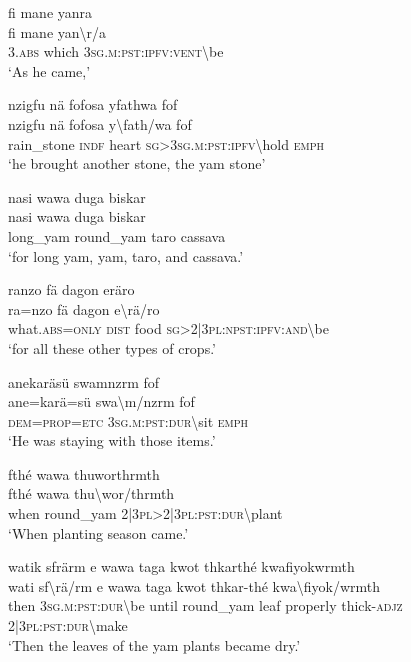 \ea\label{ex:1:a3775}
fi mane yanra\\
\gll fi	mane	yan{\textbackslash}r/a\\
     3.\textsc{abs}	which	3\textsc{sg}.\textsc{m}:\textsc{pst}:\textsc{ipfv}:\textsc{vent}{\textbackslash}be\\
\glt `As he came,'
\z

\ea\label{ex:1:a3776}
nzigfu nä fofosa yfathwa fof\\
\gll nzigfu	nä	fofosa	y{\textbackslash}fath/wa	fof\\
     rain\_stone	\textsc{indf}	heart	\textsc{sg}>3\textsc{sg}.\textsc{m}:\textsc{pst}:\textsc{ipfv}{\textbackslash}hold	\textsc{emph}\\
\glt `he brought another stone, the yam stone'
\z

\ea\label{ex:1:a3777}
nasi wawa duga biskar\\
\gll nasi	wawa	duga	biskar\\
     long\_yam	round\_yam	taro	cassava\\
\glt `for long yam, yam, taro, and cassava.'
\z

\ea\label{ex:1:a3781}
ranzo fä dagon eräro\\
\gll ra=nzo	fä	dagon	e{\textbackslash}rä/ro\\
     what.\textsc{abs}=\textsc{only}	\textsc{dist}	food	\textsc{sg}>2|3\textsc{pl}:\textsc{npst}:\textsc{ipfv}:\textsc{and}{\textbackslash}be\\
\glt `for all these other types of crops.'
\z

\ea\label{ex:1:a3782}
anekaräsü swamnzrm fof\\
\gll ane=karä=sü	swa{\textbackslash}m/nzrm	fof\\
     \textsc{dem}=\textsc{prop}=\textsc{etc}	3\textsc{sg}.\textsc{m}:\textsc{pst}:\textsc{dur}{\textbackslash}sit	\textsc{emph}\\
\glt `He was staying with those items.'
\z

\ea\label{ex:1:a3783}
fthé wawa thuworthrmth\\
\gll fthé	wawa	thu{\textbackslash}wor/thrmth\\
     when	round\_yam	2|3\textsc{pl}>2|3\textsc{pl}:\textsc{pst}:\textsc{dur}{\textbackslash}plant\\
\glt `When planting season came.'
\z

\ea\label{ex:1:a3784}
watik sfrärm e wawa taga kwot thkarthé kwafiyokwrmth\\
\gll wati	sf{\textbackslash}rä/rm	e	wawa	taga	kwot	thkar-thé	kwa{\textbackslash}fiyok/wrmth\\
     then	3\textsc{sg}.\textsc{m}:\textsc{pst}:\textsc{dur}{\textbackslash}be	until	round\_yam	leaf	properly	thick-\textsc{adjz}	2|3\textsc{pl}:\textsc{pst}:\textsc{dur}{\textbackslash}make\\
\glt `Then the leaves of the yam plants became dry.'
\z

